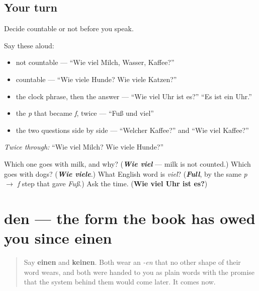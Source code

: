 \subsection*{Your turn}
Decide countable or not before you speak.

Say these aloud:

\begin{itemize}
\raggedright
  \item not countable — \textquotedblleft{}Wie viel Milch, Wasser, Kaffee?\textquotedblright{}
  \item countable — \textquotedblleft{}Wie viele Hunde? Wie viele Katzen?\textquotedblright{}
  \item the clock phrase, then the answer — \textquotedblleft{}Wie viel Uhr ist es?\textquotedblright{} \textquotedblleft{}Es ist ein Uhr.\textquotedblright{}
  \item the \emph{p} that became \emph{f}, twice — \textquotedblleft{}Fuß und viel\textquotedblright{}
  \item the two questions side by side — \textquotedblleft{}Welcher Kaffee?\textquotedblright{} and \textquotedblleft{}Wie viel Kaffee?\textquotedblright{}
\end{itemize}

\emph{Twice through:} \textquotedblleft{}Wie viel Milch? Wie viele Hunde?\textquotedblright{}

\begin{tcolorbox}[breakable,colback=teal!4,colframe=teal!35!black,title={Before you move on}]
Which one goes with milk, and why? (\emph{\textbf{Wie viel}} — milk is not counted.) Which goes with dogs? (\emph{\textbf{Wie viele}}.) What English word is \emph{viel}? (\emph{\textbf{Full}}, by the same \emph{p $\to$ f} step that gave \emph{Fuß}.) Ask the time. (\textbf{Wie viel Uhr ist es?})
\end{tcolorbox}
\section[den]{den — the form the book has owed you since einen}

\label{lesson:GE-C34-den}



\begin{quote}
Say \textbf{einen} and \textbf{keinen}. Both wear an \emph{-en} that no other shape of their word wears, and both were handed to you as plain words with the promise that the system behind them would come later. It comes now.
\end{quote}

